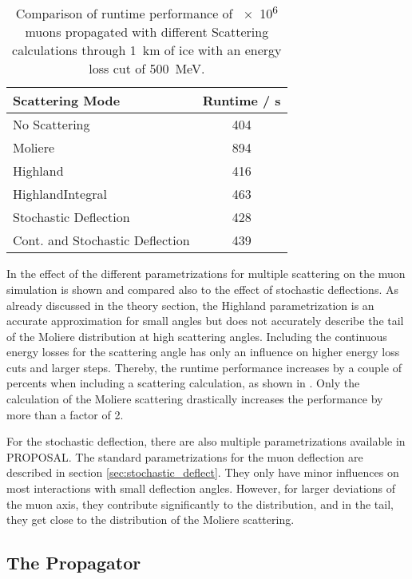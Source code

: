 \begin{table}
    \caption{Comparison of runtime performance of \num{e6} muons propagated with different Scattering calculations through \SI{1}{km} of ice with an energy loss cut of \SI{500}{MeV}.}
    \label{tab:scatter_runtime}
    \begin{center}
    \begin{tabular}{l | c }
        \toprule
        Scattering Mode & Runtime / s \\
        \midrule
        No Scattering & 404 \\
        Moliere & 894 \\
        Highland & 416 \\
        HighlandIntegral & 463 \\
        Stochastic Deflection & 428 \\
        Cont. and Stochastic Deflection & 439 \\
        \bottomrule
    \end{tabular}
    \end{center}
\end{table}

In  the effect of the different parametrizations for multiple scattering on the muon simulation is shown and compared also to the effect of stochastic deflections.
As already discussed in the theory section, the Highland parametrization is an accurate approximation for small angles but does not accurately describe the tail of the Moliere distribution at high scattering angles.
Including the continuous energy losses for the scattering angle has only an influence on higher energy loss cuts and larger steps.
Thereby, the runtime performance increases by a couple of percents when including a scattering calculation, as shown in .
Only the calculation of the Moliere scattering drastically increases the performance by more than a factor of 2.

For the stochastic deflection, there are also multiple parametrizations available in PROPOSAL.
The standard parametrizations for the muon deflection are described in section \ref{sec:stochastic_deflect}.
They only have minor influences on most interactions with small deflection angles.
However, for larger deviations of the muon axis, they contribute significantly to the distribution, and in the tail, they get close to the distribution of the Moliere scattering.

%

\subsection{The Propagator}

